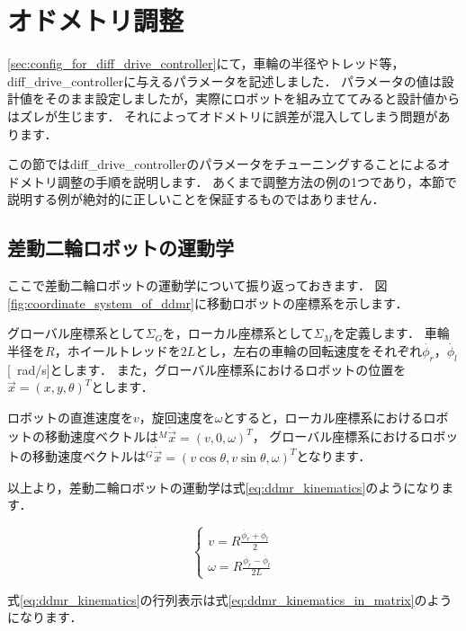 \documentclass[{../../master}]{subfiles}
\begin{document}
\section{オドメトリ調整}

\ref{sec:config_for_diff_drive_controller}にて，車輪の半径やトレッド等，\textsf{diff\_drive\_controller}に与えるパラメータを記述しました．
パラメータの値は設計値をそのまま設定しましたが，実際にロボットを組み立ててみると設計値からはズレが生じます．
それによってオドメトリに誤差が混入してしまう問題があります．

この節では\textsf{diff\_drive\_controller}のパラメータをチューニングすることによるオドメトリ調整の手順を説明します．
あくまで調整方法の例の1つであり，本節で説明する例が絶対的に正しいことを保証するものではありません．

\subsection{差動二輪ロボットの運動学}

ここで差動二輪ロボットの運動学について振り返っておきます．
図\ref{fig:coordinate_system_of_ddmr}に移動ロボットの座標系を示します．

グローバル座標系として$\Sigma_{G}$を，ローカル座標系として$\Sigma_{M}$を定義します．
車輪半径を$R$，ホイールトレッドを$2L$とし，左右の車輪の回転速度をそれぞれ$\dot{\phi_{r}}$，$\dot{\phi_{l}}$[\SI{}{rad/s}]とします．
また，グローバル座標系におけるロボットの位置を$\vec{x} = (x, y, \theta)^T$とします．

ロボットの直進速度を$v$，旋回速度を$\omega$とすると，ローカル座標系におけるロボットの移動速度ベクトルは${}^{M}\dot{\vec{x}} = (v, 0, \omega)^T$，
グローバル座標系におけるロボットの移動速度ベクトルは${}^{G}\dot{\vec{x}} = (v\cos{\theta}, v\sin{\theta}, \omega)^T$となります．

以上より，差動二輪ロボットの運動学は式\ref{eq:ddmr_kinematics}のようになります．

\begin{equation}
  \begin{cases}
    v = R \displaystyle \frac{\dot{\phi_{r}} + \dot{\phi_{l}}}{2} \\
    \omega = R \displaystyle \frac{\dot{\phi_{r}} - \dot{\phi_{l}}}{2L}
  \end{cases}
  \label{eq:ddmr_kinematics}
\end{equation}

\noindent
式\ref{eq:ddmr_kinematics}の行列表示は式\ref{eq:ddmr_kinematics_in_matrix}のようになります．
\end{document}
